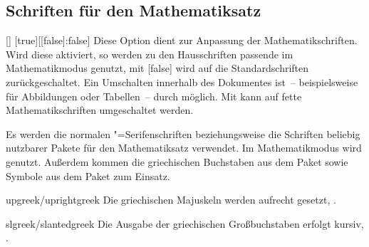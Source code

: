 \subsection{Schriften für den Mathematiksatz}
\begin{Declaration}[v2.03]{[\PBoolean]}%
  [true][[false]:false]
\printdeclarationlist%
\label{sec:math}
%
Diese Option dient zur Anpassung der Mathematikschriften. Wird diese aktiviert, 
so werden zu den Hausschriften passende im Mathematikmodus genutzt, mit 
[false] wird auf die Standardschriften zurückgeschaltet. Ein 
Umschalten innerhalb des Dokumentes ist~-- beispielsweise für Abbildungen oder 
Tabellen~-- durch  
möglich. Mit  kann auf fette Mathematikschriften umgeschaltet 
werden.
%
\begin{values}
\itemfalse
  Es werden die normalen "=Serifenschriften beziehungsweise die 
  Schriften beliebig nutzbarer Pakete für den Mathematiksatz verwendet.
\itemtrue*
  Im Mathematikmodus wird \Univers genutzt. Außerdem kommen die griechischen 
  Buchstaben aus dem Paket  sowie Symbole aus dem Paket 
   zum Einsatz.
\item[upgreek/uprightgreek]
  Die griechischen Majuskeln werden aufrecht gesetzt, 
  .
\item[slgreek/slantedgreek]
  Die Ausgabe der griechischen Großbuchstaben erfolgt kursiv, 
  .	
\end{values}
\end{Declaration}

